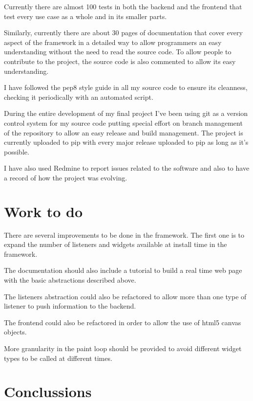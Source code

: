 \documentclass[12pt]{article}
\begin{document}
        Currently there are almost 100 tests in both the backend and the
        frontend that test every use case as a whole and in its smaller parts.

        Similarly, currently there are about 30 pages of documentation that
        cover every aspect of the framework in a detailed way to allow
        programmers an easy understanding without the need to read the source
        code. To allow people to contribute to the project, the source code is
        also commented to allow its easy understanding.

        I have followed the pep8 style guide in all my source code to ensure
        its cleanness, checking it periodically with an automated script.

        During the entire development of my final project I've been using git
        as a version control system for my source code putting special effort on
        branch management of the repository to allow an easy release and build
        management. The project is currently uploaded to pip with every major
        release uploaded to pip as long as it's possible.

        I have also used Redmine to report issues related to the software and
        also to have a record of how the project was evolving.

    \section{Work to do}
        There are several improvements to be done in the framework. The first
        one is to expand the number of listeners and widgets available at
        install time in the framework.

        The documentation should also include a tutorial to build a real time
        web page with the basic abstractions described above.

        The listeners abstraction could also be refactored to allow more than
        one type of listener to push information to the backend.

        The frontend could also be refactored in order to allow the use of html5
        canvas objects.

        More granularity in the paint loop should be provided to avoid different
        widget types to be called at different times.

    \section{Conclussions}
\end{document}
